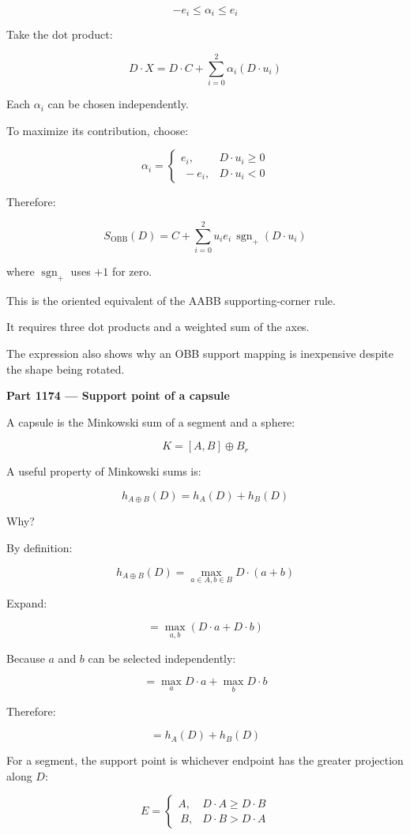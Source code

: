 \[
-e_i\le\alpha_i\le e_i
\]

Take the dot product:

\[
D\cdot X= D\cdot C+ \sum_{i=0}^2\alpha_i(D\cdot u_i)
\]

Each \(\alpha_i\) can be chosen independently.

To maximize its contribution, choose:

\[
\alpha_i= \begin{cases} e_i,&D\cdot u_i\ge0\\\ -e_i,&D\cdot u_i<0 \end{cases}
\]

Therefore:

\[
\boxed{ S_{\mathrm{OBB}}(D)= C+\sum_{i=0}^2 u_i e_i\,\operatorname{sgn}_+(D\cdot u_i) }
\]

where \(\operatorname{sgn}_+\) uses \(+1\) for zero.

This is the oriented equivalent of the AABB supporting-corner rule.

It requires three dot products and a weighted sum of the axes.

The expression also shows why an OBB support mapping is inexpensive despite the shape being rotated.

\textbf{Part 1174 --- Support point of a capsule}

A capsule is the Minkowski sum of a segment and a sphere:

\[
K=[A,B]\oplus B_r
\]

A useful property of Minkowski sums is:

\[
\boxed{ h_{A\oplus B}(D)=h_A(D)+h_B(D) }
\]

Why?

By definition:

\[
h_{A\oplus B}(D) = \max_{a\in A,b\in B}D\cdot(a+b)
\]

Expand:

\[
=\max_{a,b}(D\cdot a+D\cdot b)
\]

Because \(a\) and \(b\) can be selected independently:

\[
=\max_a D\cdot a+\max_b D\cdot b
\]

Therefore:

\[
=h_A(D)+h_B(D)
\]

For a segment, the support point is whichever endpoint has the greater projection along \(D\):

\[
E= \begin{cases} A,&D\cdot A\ge D\cdot B\\\ B,&D\cdot B>D\cdot A \end{cases}
\]

